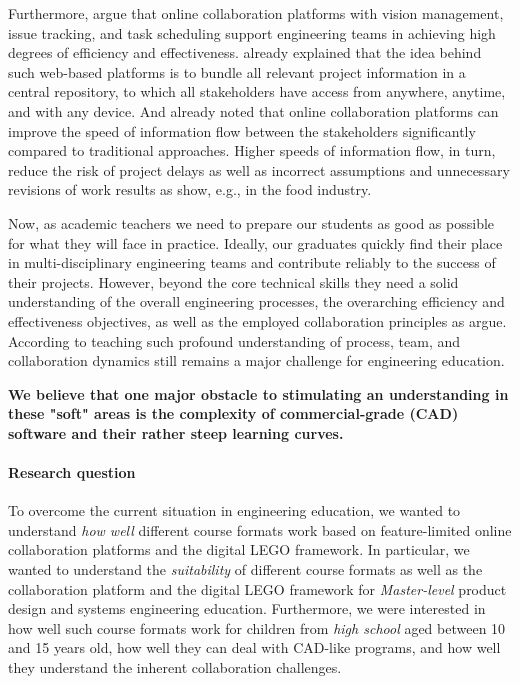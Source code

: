 \documentclass{PDS}
\begin{document}
Furthermore, \cite{Hackenberg_2023} argue that online collaboration platforms with vision management, issue tracking, and task scheduling support engineering teams in achieving high degrees of efficiency and effectiveness.
\cite{Tony_Liu_2001} already explained that the idea behind such web-based platforms is to bundle all relevant project information in a central repository, to which all stakeholders have access from anywhere, anytime, and with any device.
And \cite{Kraemer_1988} already noted that online collaboration platforms can improve the speed of information flow between the stakeholders significantly compared to traditional approaches.
Higher speeds of information flow, in turn, reduce the risk of project delays as well as incorrect assumptions and unnecessary revisions of work results as \cite{Novak_2009} show, e.g., in the food industry.

Now, as academic teachers we need to prepare our students as good as possible for what they will face in practice.
Ideally, our graduates quickly find their place in multi-disciplinary engineering teams and contribute reliably to the success of their projects.
However, beyond the core technical skills they need a solid understanding of the overall engineering processes, the overarching efficiency and effectiveness objectives, as well as the employed collaboration principles as \cite{Deshpande_2011} argue.
According to \cite{Meyer_2020} teaching such profound understanding of process, team, and collaboration dynamics still remains a major challenge for engineering education.

\textbf{We believe that one major obstacle to stimulating an understanding in these "soft" areas is the complexity of commercial-grade (CAD) software and their rather steep learning curves.}

\paragraph{Research question}

To overcome the current situation in engineering education, we wanted to understand \textit{how well} different course formats work based on feature-limited online collaboration platforms and the digital LEGO framework.
In particular, we wanted to understand the \textit{suitability} of different course formats as well as the collaboration platform and the digital LEGO framework for \textit{Master-level} product design and systems engineering education.
Furthermore, we were interested in how well such course formats work for children from \textit{high school} aged between 10 and 15 years old, how well they can deal with CAD-like programs, and how well they understand the inherent collaboration challenges.
\end{document}
